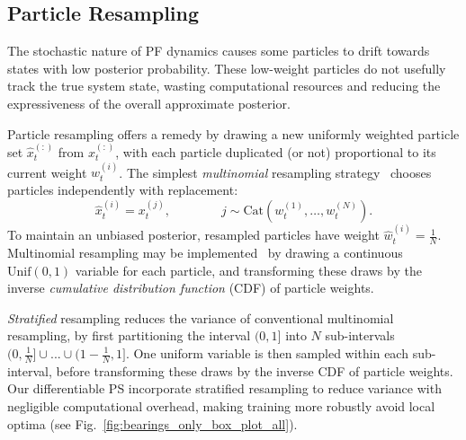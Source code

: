     \subsection{Particle Resampling}
        The stochastic nature of PF dynamics causes some particles to drift towards states with low posterior probability. These low-weight particles do not usefully track the true system state, wasting computational resources and reducing the expressiveness of the overall approximate posterior. %
        
        Particle resampling offers a remedy by drawing a new uniformly weighted particle set $\hat{x}_t^{(:)}$ from $x_t^{(:)}$, with each particle duplicated (or not) proportional to its current weight $w_t^{(i)}$. The simplest 
        \emph{multinomial} resampling strategy~\cite{doi:10.1080/10618600.1996.10474692stratified, douc2005comparison, 7079001Resapling} chooses particles independently with replacement:
        \begin{equation}
             \hat{x}_t^{(i)} = x_t^{(j)},  \qquad\qquad j \sim \text{Cat}(w_t^{(1)},\ldots,w_t^{(N)}).
            \label{eqn:multinomial_resampling}
        \end{equation}	
        To maintain an unbiased posterior, resampled particles have weight $\hat{w}_t^{(i)} = \frac{1}{N}$. 
        Multinomial resampling may be implemented~\cite{douc2005comparison} by drawing a continuous $\text{Unif}(0,1)$ variable for each particle, and transforming these draws by the inverse \emph{cumulative distribution function} (CDF) of particle weights. %

        \emph{Stratified} resampling \cite{doi:10.1080/10618600.1996.10474692stratified, douc2005comparison, 7079001Resapling} reduces the variance of conventional multinomial resampling, by first partitioning the interval $(0, 1]$ into $N$ sub-intervals $(0, \frac{1}{N}] \cup ... \cup (1- \frac{1}{N}, 1]$.  One uniform variable is then sampled within each sub-interval, before transforming these draws by the inverse CDF of particle weights. %
        Our differentiable PS incorporate stratified resampling to reduce variance with negligible computational overhead, making training more robustly avoid local optima (see Fig.~\ref{fig:bearings_only_box_plot_all}).
        
